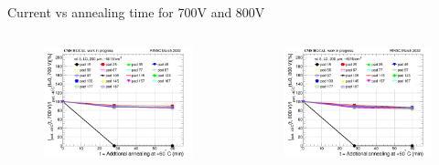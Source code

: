 \documentclass{beamer}
\begin{document}
\begin{frame}{Current vs annealing time for 700V and 800V}
  \begin{columns}
       \begin{figure}
           \includegraphics[width=1.0\textwidth]{plots/8in_198ch_2019_N4790_09_4E15_neg40degC_annealing_current_700.png}
       \end{figure}
       \begin{figure}
           \includegraphics[width=1.0\textwidth]{plots/8in_198ch_2019_N4790_09_4E15_neg40degC_annealing_current_800.png}
       \end{figure}
   \end{columns}
\end{frame}
\end{document}
